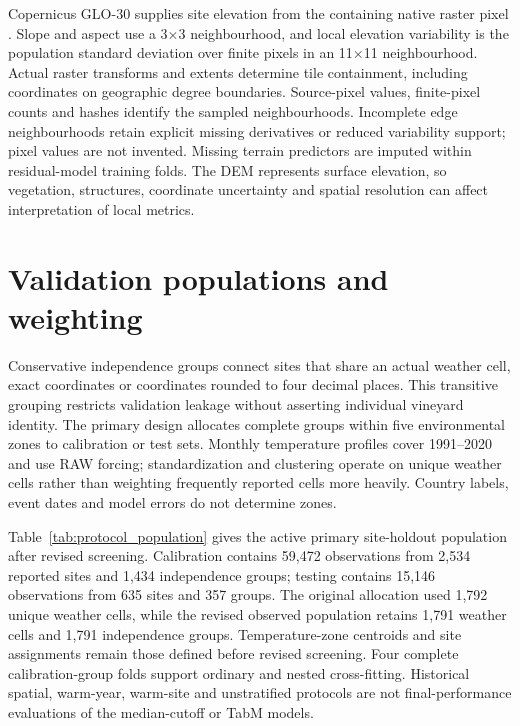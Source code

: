 \documentclass[a4paper,11pt]{article}
\let\OriginalSection\section
\renewcommand{\section}{\FloatBarrier\OriginalSection}
\begin{document}
Copernicus GLO-30 supplies site elevation from the containing native raster
pixel \citep{esaAirbusCopernicusDEM2022}. Slope and aspect use a 3$\times$3 neighbourhood, and local elevation
variability is the population standard deviation over finite pixels in an
11$\times$11 neighbourhood. Actual raster transforms and extents determine
tile containment, including coordinates on geographic degree boundaries.
Source-pixel values, finite-pixel counts and hashes identify the sampled
neighbourhoods. Incomplete edge neighbourhoods retain explicit missing
derivatives or reduced variability support; pixel values are not invented.
Missing terrain predictors are imputed within residual-model training folds.
The DEM represents surface elevation, so vegetation, structures, coordinate
uncertainty and spatial resolution can affect interpretation of local metrics.

\section{Validation populations and weighting}

Conservative independence groups connect sites that share an actual weather
cell, exact coordinates or coordinates rounded to four decimal places. This
transitive grouping restricts validation leakage without asserting individual
vineyard identity. The primary design allocates complete groups within five
environmental zones to calibration or test sets. Monthly temperature profiles
cover 1991--2020 and use RAW forcing; standardization and clustering operate
on unique weather cells rather than weighting frequently reported cells more
heavily. Country labels, event dates and model errors do not determine zones.

Table~\ref{tab:protocol_population} gives the active primary site-holdout population after revised screening. Calibration contains 59,472 observations from 2,534 reported sites and 1,434 independence groups; testing contains 15,146 observations from 635 sites and 357 groups. The original allocation used 1,792 unique weather cells, while the revised observed population retains 1,791 weather cells and 1,791 independence groups. Temperature-zone centroids and site assignments remain those defined before revised screening. Four complete calibration-group folds support ordinary and nested cross-fitting. Historical spatial, warm-year, warm-site and unstratified protocols are not final-performance evaluations of the median-cutoff or TabM models.

\begin{table}[!htbp]
\centering
\caption{Active primary calibration and test populations after revised screening. The last four columns contain observations of BBCH07, BBCH65, BBCH81 and BBCH89. Groups are the unchanged conservative independence units; no group spans calibration and testing.}

\label{tab:protocol_population}
\small
\resizebox{\textwidth}{!}{}
\end{table}
\end{document}
